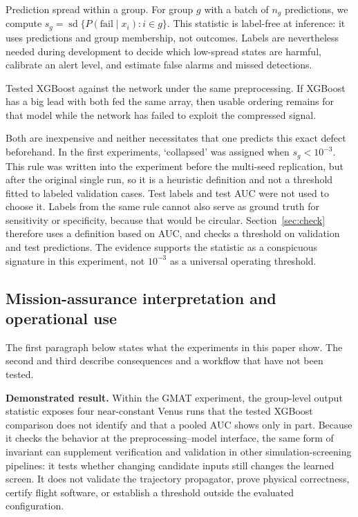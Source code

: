 \documentclass{IEEEtaes}
\begin{document}
Prediction spread within a group. For group $g$ with a batch of $n_g$ predictions, we compute $s_g=\operatorname{sd}\{P(\mathrm{fail}\mid x_i):i\in g\}$. This statistic is label-free at inference: it uses predictions and group membership, not outcomes. Labels are nevertheless needed during development to decide which low-spread states are harmful, calibrate an alert level, and estimate false alarms and missed detections.

Tested XGBoost against the network under the same preprocessing. If XGBoost has a big lead with both fed the same array, then usable ordering remains for that model while the network has failed to exploit the compressed signal.

Both are inexpensive and neither necessitates that one predicts this exact defect beforehand. In the first experiments, `collapsed' was assigned when $s_g<10^{-3}$. This rule was written into the experiment before the multi-seed replication, but after the original single run, so it is a heuristic definition and not a threshold fitted to labeled validation cases. Test labels and test AUC were not used to choose it. Labels from the same rule cannot also serve as ground truth for sensitivity or specificity, because that would be circular. Section~\ref{sec:check} therefore uses a definition based on AUC, and checks a threshold on validation and test predictions. The evidence supports the statistic as a conspicuous signature in this experiment, not $10^{-3}$ as a universal operating threshold.

\subsection{Mission-assurance interpretation and operational use}

The first paragraph below states what the experiments in this paper show. The second and third describe consequences and a workflow that have not been tested.

\textbf{Demonstrated result.} Within the GMAT experiment, the group-level output statistic exposes four near-constant Venus runs that the tested XGBoost comparison does not identify and that a pooled AUC shows only in part. Because it checks the behavior at the preprocessing--model interface, the same form of invariant can supplement verification and validation in other simulation-screening pipelines: it tests whether changing candidate inputs still changes the learned screen. It does not validate the trajectory propagator, prove physical correctness, certify flight software, or establish a threshold outside the evaluated configuration.
\end{document}
